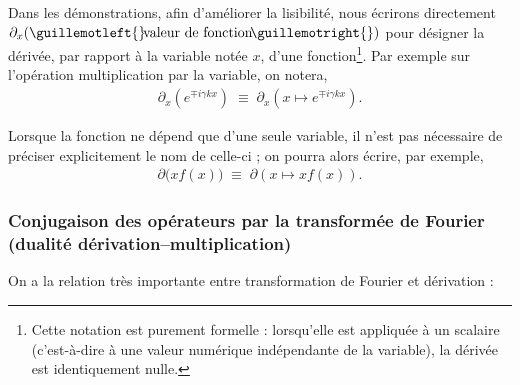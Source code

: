 Dans les démonstrations, afin d’améliorer la lisibilité, nous écrirons directement
$\partial_x(\guillemotleft{}\!\text{valeur de fonction}\!\guillemotright{})$
pour désigner la dérivée, par rapport à la variable notée \guillemotleft{}$x$\guillemotright{}, d’une fonction\footnote{%
Cette notation est purement formelle : lorsqu’elle est appliquée à un scalaire (c’est-à-dire à une valeur numérique indépendante de la variable), la dérivée est identiquement nulle.}. Par exemple sur l'opération \guillemotleft{} multiplication par la variable\guillemotright{}, on notera,
\begin{eqnarray}
\partial_x \left( e^{\mp i \gamma k x} \right)
\;\equiv\;
\partial_x \left( x \mapsto e^{\mp i \gamma k x} \right).
\end{eqnarray}

Lorsque la fonction ne dépend que d’une seule variable, il n’est pas nécessaire de préciser explicitement le nom de celle-ci ; on pourra alors écrire, par exemple,
\begin{eqnarray}
\partial \bigl( x f(x) \bigr)
\;\equiv\;
\partial \left( x \mapsto x f(x) \right).
\end{eqnarray}


\medskip

\subsubsection{Conjugaison des opérateurs par la transformée de Fourier {\tiny (dualité dérivation–multiplication)}}


On a la relation très importante entre transformation de Fourier et dérivation :

